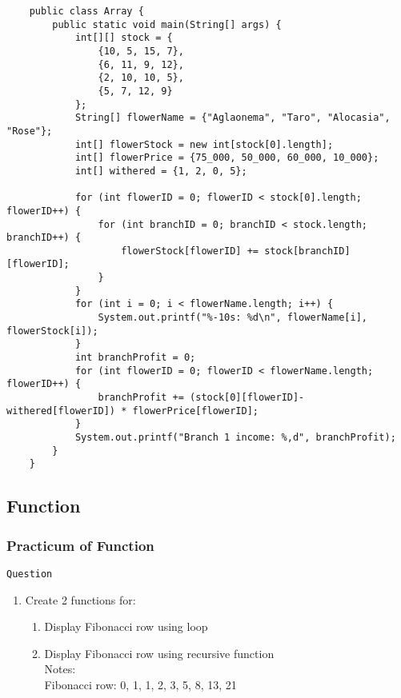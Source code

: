 \documentclass[12pt,titlepage]{article}
\begin{document}
\begin{verbatim}
    public class Array {
        public static void main(String[] args) {
            int[][] stock = {
                {10, 5, 15, 7},
                {6, 11, 9, 12},
                {2, 10, 10, 5},
                {5, 7, 12, 9}
            };
            String[] flowerName = {"Aglaonema", "Taro", "Alocasia", "Rose"};
            int[] flowerStock = new int[stock[0].length];
            int[] flowerPrice = {75_000, 50_000, 60_000, 10_000};
            int[] withered = {1, 2, 0, 5};

            for (int flowerID = 0; flowerID < stock[0].length; flowerID++) {
                for (int branchID = 0; branchID < stock.length; branchID++) {
                    flowerStock[flowerID] += stock[branchID][flowerID];
                }
            }
            for (int i = 0; i < flowerName.length; i++) {
                System.out.printf("%-10s: %d\n", flowerName[i], flowerStock[i]);
            }
            int branchProfit = 0;
            for (int flowerID = 0; flowerID < flowerName.length; flowerID++) {
                branchProfit += (stock[0][flowerID]-withered[flowerID]) * flowerPrice[flowerID];
            }
            System.out.printf("Branch 1 income: %,d", branchProfit);
        }
    }

\end{verbatim}

\subsection{Function}

\subsubsection{Practicum of Function}

\texttt{Question}

\begin{enumerate}
    \item Create 2 functions for:
    \begin{enumerate}
        \item Display Fibonacci row using loop
        \item Display Fibonacci row using recursive function
        \mbox{}\\ Notes: 
        \mbox{}\\ Fibonacci row: 0, 1, 1, 2, 3, 5, 8, 13, 21
    \end{enumerate}
\end{enumerate}
\end{document}

